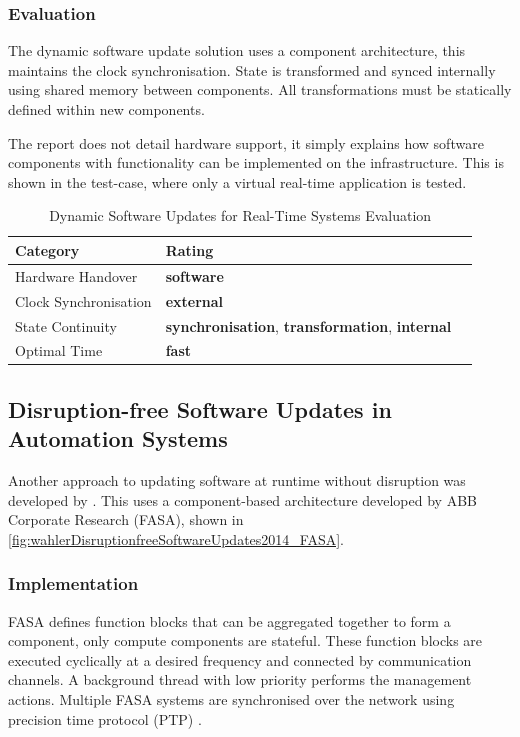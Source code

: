 \subsubsection{Evaluation}
The dynamic software update solution uses a component architecture, this maintains the clock synchronisation. State is transformed and synced internally using shared memory between components. All transformations must be statically defined within new components.

The report does not detail hardware support, it simply explains how software components with functionality can be implemented on the infrastructure. This is shown in the test-case, where only a virtual real-time application is tested.

\begin{table}[ht]
    \centering
    \begin{tabular}{lll}
        Category & Rating  \\ \hline
        Hardware Handover & \textbf{software} \\
        Clock Synchronisation & \textbf{external} \\
        State Continuity & \textbf{synchronisation}, \textbf{transformation}, \textbf{internal} \\
        Optimal Time & \textbf{fast}     
    \end{tabular}
    \caption[Dynamic Software Updates for Real-Time Systems Evaluation]
    {Dynamic Software Updates for Real-Time Systems Evaluation}
    \label{tbl:wahlerDynamicSoftwareUpdates2009Evaluation}
\end{table}

\clearpage


\subsection{Disruption-free Software Updates in Automation Systems} \label{caseStudy3}
Another approach to updating software at runtime without disruption was developed by \textcite{wahlerDisruptionfreeSoftwareUpdates2014}. This uses a component-based architecture developed by ABB Corporate Research (FASA), shown in \autoref{fig:wahlerDisruptionfreeSoftwareUpdates2014_FASA}.

\subsubsection{Implementation}
FASA defines function blocks that can be aggregated together to form a component, only compute components are stateful. These function blocks are executed cyclically at a desired frequency and connected by communication channels. A background thread with low priority performs the management actions. Multiple FASA systems are synchronised over the network using precision time protocol (PTP) \autocite{wahlerDisruptionfreeSoftwareUpdates2014}.

